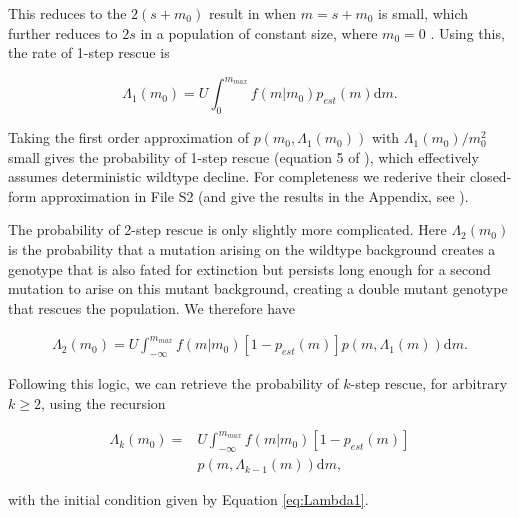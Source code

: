 \documentclass[9pt,twocolumn,twoside,lineno]{gsajnl}
\begin{document}
\noindent This reduces to the $2(s+m_{0})$ result in \cite{Otto1997} when $m = s + m_{0}$ is small, which further reduces to $2s$ in a population of constant size, where $m_{0}=0$ \citep{Haldane1927}.
Using this, the rate of 1-step rescue is

\begin{equation}\label{eq:Lambda1}
\Lambda_1(m_0) = U \int_0^{m_{max}} f(m|m_0) p_{est}(m) \mathrm{d}m.
\end{equation}

\noindent Taking the first order approximation of $p(m_0,\Lambda_1(m_0))$ with $\Lambda_1(m_0)/m_0^2$ small gives the probability of 1-step rescue (equation 5 of \citealp{Anciaux2018}), which effectively assumes deterministic wildtype decline.
For completeness we rederive their closed-form approximation in File S2 (and give the results in the Appendix, see ).

The probability of 2-step rescue is only slightly more complicated.
Here $\Lambda_2(m_0)$ is the probability that a mutation arising on the wildtype background creates a genotype that is also fated for extinction but persists long enough for a second mutation to arise on this mutant background, creating a double mutant genotype that rescues the population.
We therefore have

\begin{equation}\label{eq:Lambda2}
\begin{aligned}
\Lambda_2(m_0) = U \int_{-\infty}^{m_{max}} f(m|m_0) \left[ 1 - p_{est}(m) \right] p(m,\Lambda_{1}(m)) \mathrm{d}m.
\end{aligned}
\end{equation}

Following this logic, we can retrieve the probability of $k$-step rescue, for arbitrary $k\geq2$,  using the recursion

\begin{equation}\label{eq:Lambdak}
\begin{aligned}
\Lambda_k(m_0) =& U \int_{-\infty}^{m_{max}} f(m|m_0) \left[ 1 - p_{est}(m) \right] \\
                       & p(m,\Lambda_{k-1}(m)) \mathrm{d}m,
\end{aligned}
\end{equation}

\noindent with the initial condition given by Equation \ref{eq:Lambda1}.
\end{document}
